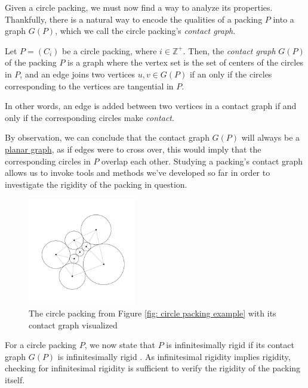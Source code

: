 \begin{flushleft}
Given a circle packing, we must now find a way to analyze its properties. Thankfully, there is a natural way to encode the qualities of a packing $P$ into a graph $G(P)$, which we call the circle packing's \textit{contact graph}.
\end{flushleft}

\begin{definition}
\label{def: contact graph}
Let $P = (C_i)$ be a circle packing, where $i \in \mathbb{Z}^+$. Then, the \textit{contact graph} $G(P)$ of the packing $P$ is a graph where the vertex set is the set of centers of the circles in $P$, and an edge joins two vertices $u, v \in G(P)$ if an only if the circles corresponding to the vertices are tangential in $P$.
\end{definition}

\begin{flushleft}
In other words, an edge is added between two vertices in a contact graph if and only if the corresponding circles make \textit{contact}.
\end{flushleft}

\begin{flushleft}
By observation, we can conclude that the contact graph $G(P)$ will always be a \hyperref[def: planar graphs]{planar graph}, as if edges were to cross over, this would imply that the corresponding circles in $P$ overlap each other. Studying a packing's contact graph allows us to invoke tools and methods we've developed so far in order to investigate the rigidity of the packing in question. 
\end{flushleft}

\begin{figure}[htbp]
    \centering
    \includegraphics[width = 0.42\textwidth]{Chapter 3/8. Packing with contact.png}
    \caption{The circle packing from Figure \ref{fig: circle packing example} with its contact graph visualized}
    \label{fig: circle packing with contact}
\end{figure}
\vspace{-4 mm}
\begin{flushleft}
For a circle packing $P$, we now state that $P$ is infinitesimally rigid if its contact graph $G(P)$ is infinitesimally rigid \cite{sticky}. As infinitesimal rigidity implies rigidity, checking for infinitesimal rigidity is sufficient to verify the rigidity of the packing itself. 
\end{flushleft}

